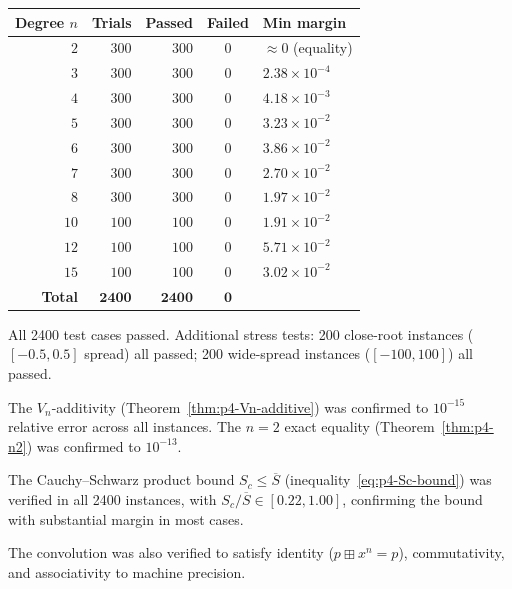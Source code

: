\begin{center}
\begin{tabular}{rrrcl}
\textbf{Degree $n$} & \textbf{Trials} & \textbf{Passed} & \textbf{Failed}
  & \textbf{Min margin} \\
\hline
$2$  & $300$ & $300$ & $0$ & $\approx 0$ (equality) \\
$3$  & $300$ & $300$ & $0$ & $2.38 \times 10^{-4}$ \\
$4$  & $300$ & $300$ & $0$ & $4.18 \times 10^{-3}$ \\
$5$  & $300$ & $300$ & $0$ & $3.23 \times 10^{-2}$ \\
$6$  & $300$ & $300$ & $0$ & $3.86 \times 10^{-2}$ \\
$7$  & $300$ & $300$ & $0$ & $2.70 \times 10^{-2}$ \\
$8$  & $300$ & $300$ & $0$ & $1.97 \times 10^{-2}$ \\
$10$ & $100$ & $100$ & $0$ & $1.91 \times 10^{-2}$ \\
$12$ & $100$ & $100$ & $0$ & $5.71 \times 10^{-2}$ \\
$15$ & $100$ & $100$ & $0$ & $3.02 \times 10^{-2}$ \\
\hline
\textbf{Total} & $\mathbf{2400}$ & $\mathbf{2400}$ & $\mathbf{0}$ & \\
\end{tabular}
\end{center}

\noindent
All 2400 test cases passed. Additional stress tests: 200 close-root
instances ($[-0.5, 0.5]$ spread) all passed; 200 wide-spread instances
($[-100, 100]$) all passed.

The $V_n$-additivity (Theorem~\ref{thm:p4-Vn-additive}) was confirmed
to $10^{-15}$ relative error across all instances. The $n = 2$ exact
equality (Theorem~\ref{thm:p4-n2}) was confirmed to $10^{-13}$.

The Cauchy--Schwarz product bound $S_c \leq \overline{S}$
(inequality~\eqref{eq:p4-Sc-bound}) was verified in all 2400 instances,
with $S_c / \overline{S} \in [0.22, 1.00]$, confirming the bound with
substantial margin in most cases.

The convolution was also verified to satisfy identity ($p \boxplus x^n = p$),
commutativity, and associativity to machine precision.

